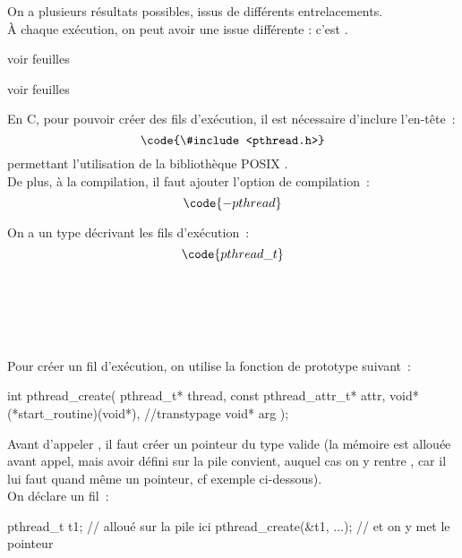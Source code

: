 \begin{adjustwidth}{-3cm}{-3cm}
On a plusieurs résultats possibles, issus de différents entrelacements.\\

À chaque exécution, on peut avoir une issue différente : c'est .



\begin{exemple}{}{}
    voir feuilles
\end{exemple}

\begin{exemple}{}{}
    voir feuilles
\end{exemple}

En C, pour pouvoir créer des fils d'exécution, il est nécessaire d'inclure l'en-tête~:
$$\code{\#include <pthread.h>}$$
permettant l'utilisation de la bibliothèque POSIX .\\
De plus, à la compilation, il faut ajouter l'option de compilation~:
$$\code{-pthread}$$

On a un type décrivant les fils d'exécution~:
$$\code{pthread\_t}$$
\\\\\\\\\\
Pour créer un fil d'exécution, on utilise la fonction de prototype suivant~:
\begin{lstC}
    int pthread_create(
        pthread_t* thread,
        const pthread_attr_t* attr,
        void* (*start_routine)(void*), //transtypage
        void* arg
    );
\end{lstC}

Avant d'appeler , il faut créer un pointeur du type  valide (la mémoire est allouée avant appel, mais avoir défini sur la pile convient, auquel cas on y rentre , car il lui faut quand même un pointeur, cf exemple ci-dessous).\\
On déclare un fil~:
\begin{lstC}
    pthread_t t1; // alloué sur la pile ici
    pthread_create(&t1, $\dots$); // et on y met le pointeur
\end{lstC}




\end{adjustwidth}
